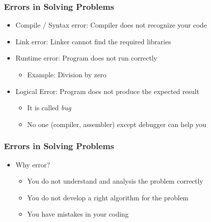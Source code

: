 \documentclass{../c-lecture}
\begin{document}
\begin{frame}
  \frametitle{Errors in Solving Problems}
  \begin{itemize}
    \item Compile / Syntax error: Compiler does not recognize your code
    \item Link error: Linker cannot find the required libraries
    \item Runtime error: Program does not run correctly
    \begin{itemize}
      \item Example: Division by zero
    \end{itemize}
    \item Logical Error: Program does not produce the expected result
    \begin{itemize}
      \item It is called \textit{\color{Red} bug}
      \item No one (compiler, assembler) except debugger can help you
    \end{itemize}
  \end{itemize}
\end{frame}

\begin{frame}
  \frametitle{Errors in Solving Problems}
  \begin{itemize}
    \item Why error?
    \begin{itemize}
      \item You do not understand and analysis the problem correctly
      \item You do not develop a right algorithm for the problem
      \item You have mistakes in your coding
    \end{itemize}
  \end{itemize}
\end{frame}
\end{document}

